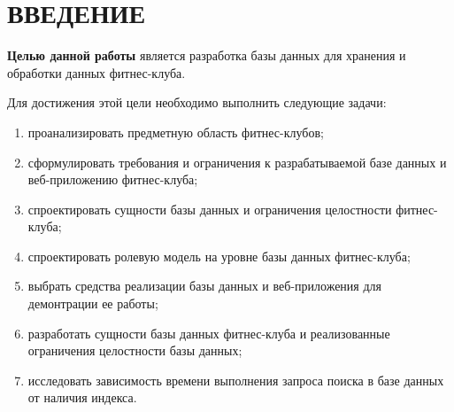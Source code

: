 \section*{\hfill ВВЕДЕНИЕ \hfill}

\textbf{Целью данной работы} является разработка базы данных для хранения и обработки данных фитнес-клуба.

Для достижения этой цели необходимо выполнить следующие задачи:
\begin{enumerate}[label=\arabic*)]
	\item проанализировать предметную область фитнес-клубов;
	\item сформулировать требования и ограничения к разрабатываемой базе данных и веб-приложению фитнес-клуба;
	\item спроектировать сущности базы данных и ограничения целостности фитнес-клуба;
	\item спроектировать ролевую модель на уровне базы данных фитнес-клуба;
	\item выбрать средства реализации базы данных и веб-приложения для демонтрации ее работы;
	\item разработать сущности базы данных фитнес-клуба и реализованные ограничения целостности базы данных;
	\item исследовать зависимость времени выполнения запроса поиска в базе данных от наличия индекса.
\end{enumerate}